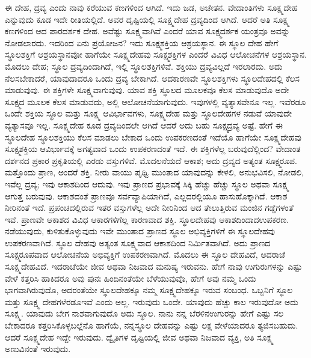 ಈ ದೇಹ, ದ್ರವ್ಯ ಎಂದು ನಾವು ಕರೆಯುವ ಕಣಗಳಿಂದ ಆಗಿದೆ. ಇದು ಜಡ, ಅಚೇತನ. ವೇದಾಂತಿಗಳು ಸೂಕ್ಷ್ಮದೇಹ ಎನ್ನುವುದು ಕೂಡ ಇದೇ ರೀತಿಯಲ್ಲಿದೆ. ಅವರ ದೃಷ್ಟಿಯಲ್ಲಿ ಸೂಕ್ಷ್ಮದೇಹ ದ್ರವ್ಯದಿಂದ ಆಗಿದೆ. ಆದರೆ ಅತಿ ಸೂಕ್ಷ್ಮ ಕಣಗಳಿಂದ ಆದ ಪಾರದರ್ಶಕ ದೇಹ. ಅವೆಷ್ಟು ಸೂಕ್ಷ್ಮವಾಗಿವೆ ಎಂದರೆ ಯಾವ ಸೂಕ್ಷ್ಮದರ್ಶಕ ಯಂತ್ರವೂ ಅವನ್ನು ನೋಡಲಾರದು. ಇದರಿಂದ ಏನು ಪ್ರಯೋಜನ? ಇದು ಸೂಕ್ಷ್ಮಶಕ್ತಿಯ ಆಶ್ರಯಸ್ಥಾನ. ಈ ಸ್ಥೂಲ ದೇಹ ಹೇಗೆ ಸ್ಥೂಲಶಕ್ತಿಗೆ ಆಶ್ರಯಸ್ಥಾನವೋ ಹಾಗೆಯೇ ಸೂಕ್ಷ್ಮದೇಹವು ಸೂಕ್ಷ್ಮಶಕ್ತಿಗಳ ಎಂದರೆ ವಿವಿಧ ಆಲೋಚನೆಗಳ ಆಶ್ರಯಸ್ಥಾನ. ಮೊದಲು ದೇಹ; ಸ್ಥೂಲ ದ್ರವ್ಯದಿಂದಾಗಿದೆ, ಇಲ್ಲಿ ಸ್ಥೂಲಶಕ್ತಿಗಳಿವೆ. ಶಕ್ತಿಯು ದ್ರವ್ಯವಿಲ್ಲದೆ ಇರಲಾರದು. ಅದು ನೆಲಸಬೇಕಾದರೆ, ಯಾವುದಾದರೂ ಒಂದು ದ್ರವ್ಯ ಬೇಕಾಗಿದೆ. ಆದಕಾರಣವೇ ಸ್ಥೂಲಶಕ್ತಿಗಳು ಸ್ಥೂಲದೇಹದಲ್ಲಿ ಕೆಲಸ ಮಾಡುವುವು. ಈ ಶಕ್ತಿಗಳೇ ಸೂಕ್ಷ್ಮವಾಗುವುವು. ಯಾವ ಶಕ್ತಿ ಸ್ಥೂಲದ ಮೂಲಕವೂ ಕೆಲಸ ಮಾಡುವುದೊ ಅದೇ ಸೂಕ್ಷ್ಮದ ಮೂಲಕ ಕೆಲಸ ಮಾಡುವದು, ಅಲ್ಲಿ ಆಲೋಚನೆಯಾಗುವುದು. ಇವುಗಳಲ್ಲಿ ವ್ಯತ್ಯಾಸವೇನೂ ಇಲ್ಲ. ಇವೆರಡೂ ಒಂದೇ ಶಕ್ತಿಯ ಸ್ಥೂಲ ಮತ್ತು ಸೂಕ್ಷ್ಮ ಆವಿರ್ಭಾವಗಳು, ಸೂಕ್ಷ್ಮದೇಹ ಮತ್ತು ಸ್ಥೂಲದೇಹಗಳ ನಡುವೆ ಯಾವುದೇ ವ್ಯತ್ಯಾಸವೂ ಇಲ್ಲ. ಸೂಕ್ಷ್ಮದೇಹ ಕೂಡ ದ್ರವ್ಯದಿಂದಲೇ ಆಗಿದೆ ಆದರೆ ಅದು ಬಹು ಸೂಕ್ಷ್ಮದ್ರವ್ಯ ಅಷ್ಟೆ. ಹೇಗೆ ಈ ಸ್ಥೂಲದೇಹ ಸ್ಥೂಲಶಕ್ತಿಯು ಕೆಲಸ ಮಾಡಲು ಬೇಕಾದ ಒಂದು ಉಪಕರಣದಂತೆ ಇದೆಯೊ ಹಾಗೆಯೇ ಸೂಕ್ಷ್ಮದೇಹವು ಸೂಕ್ಷ್ಮಶಕ್ತಿಯ ಆವಿರ್ಭಾವಕ್ಕೆ ಅಗತ್ಯವಾದ ಒಂದು ಉಪಕರಣದಂತೆ ಇದೆ. ಈ ಶಕ್ತಿಗಳೆಲ್ಲ ಬರುವುದೆಲ್ಲಿಂದ? ವೇದಾಂತ ದರ್ಶನದ ಪ್ರಕಾರ ಪ್ರಕೃತಿಯಲ್ಲಿ ಎರಡು ವಸ್ತುಗಳಿವೆ. ಮೊದಲನೆಯದೆ ಆಕಾಶ; ಅದು ದ್ರವ್ಯದ ಅತ್ಯಂತ ಸೂಕ್ಷ್ಮರೂಪ. ಮತ್ತೊಂದು ಪ್ರಾಣ, ಅಂದರೆ ಶಕ್ತಿ. ನೀರು ವಾಯು ಪೃಥ್ವಿ ಮುಂತಾದ ಯಾವುದನ್ನು ಕೇಳಲಿ, ಅನುಭವಿಸಲಿ, ನೋಡಲಿ, ಇವೆಲ್ಲ ದ್ರವ್ಯ; ಇವು ಆಕಾಶದಿಂದ ಆದುವು. ಇವು ಪ್ರಾಣದ ಪ್ರಭಾವಕ್ಕೆ ಸಿಕ್ಕಿ ಹೆಚ್ಚು ಹೆಚ್ಚು ಸ್ಥೂಲ ಅಥವಾ ಸೂಕ್ಷ್ಮ ಆಗುತ್ತ ಬರುವುವು. ಆಕಾಶದಂತೆ ಪ್ರಾಣವೂ ಸರ್ವವ್ಯಾಪಿಯಾಗಿದೆ, ಎಲ್ಲದರಲ್ಲಿಯೂ ಹಾಸುಹೊಕ್ಕಾಗಿದೆ. ಆಕಾಶ ನೀರಿನಂತೆ ಇದೆ. ಪ್ರಪಂಚದಲ್ಲಿರುವ ಇತರ ವಸ್ತುಗಳೆಲ್ಲ ಅದೇ ನೀರಿನಿಂದ ಆದ ತೇಲುತ್ತಿರುವ ಮಂಜಿನ ಗಡ್ಡೆಗಳಂತೆ ಇವೆ. ಪ್ರಾಣವೇ ಆಕಾಶದ ವಿವಿಧ ಆಕಾರಗಳಿಗೆಲ್ಲ ಕಾರಣವಾದ ಶಕ್ತಿ. ಸ್ಥೂಲದೇಹವು ಆಕಾಶದಿಂದಾದ\break ಉಪಕರಣ. ನಡೆಯುವುದು, ಕುಳಿತುಕೊಳ್ಳುವುದು ಇವೇ ಮುಂತಾದ ಪ್ರಾಣದ ಸ್ಥೂಲ ಅಭಿವ್ಯಕ್ತಿಗಳಿಗೆ ಈ ಸ್ಥೂಲದೇಹವು ಉಪಕರಣವಾಗಿದೆ. ಸ್ಥೂಲ ದೇಹವು ಅತ್ಯಂತ ಸೂಕ್ಷ್ಮವಾದ ಆಕಾಶದಿಂದ ನಿರ್ಮಿತವಾಗಿದೆ. ಅದು ಪ್ರಾಣದ ಸೂಕ್ಷ್ಮರೂಪವಾದ ಆಲೋಚನೆಯ ಅಭಿವ್ಯಕ್ತಿಗೆ ಉಪಕರಣವಾಗಿದೆ. ಮೊದಲು ಈ ಸ್ಥೂಲ ದೇಹವಿದೆ, ಅದರಾಚೆ ಸೂಕ್ಷ್ಮದೇಹವಿದೆ. ಇದರಾಚೆಯೇ ಜೀವ ಅಥವಾ ನಿಜವಾದ ಮನುಷ್ಯ ಇರುವನು. ಹೇಗೆ ನಾವು ಉಗುರುಗಳನ್ನು ಎಷ್ಟು ವೇಳೆ ಕತ್ತರಿಸಿ ಹಾಕಿದರೂ ಅವು ಪುನಃ ಹಿಂದಿನಂತೆಯೇ ಬೆಳೆಯುವುವೊ, ಹೇಗೆ ಅವು ನಮ್ಮ ಒಂದು ಭಾಗವಾಗಿರುವುದೊ, ಅದರಂತೆಯೇ ಸ್ಥೂಲದೇಹಕ್ಕೂ ನಮ್ಮ ಸೂಕ್ಷ್ಮದೇಹಕ್ಕೂ ಇರುವ ಸಂಬಂಧ. ಒಬ್ಬನಿಗೆ ಸ್ಥೂಲ ಮತ್ತು ಸೂಕ್ಷ್ಮ ದೇಹಗಳೆರಡೂ\break ಇವೆ ಎಂದು ಅಲ್ಲ. ಇರುವುದು ಒಂದೇ. ಯಾವುದು ಹೆಚ್ಚು ಕಾಲ ಇರುವುದೋ ಅದು ಸೂಕ್ಷ್ಮ. ಯಾವುದು ಬೇಗ ನಾಶವಾಗುವುದೊ ಅದು ಸ್ಥೂಲ. ನಾನು ನನ್ನ ಬೆರಳಿನ\break ಉಗುರನ್ನು ಹೇಗೆ ಎಷ್ಟು ಸಲ ಬೇಕಾದರೂ ಕತ್ತರಿಸಿಕೊಳ್ಳಬಲ್ಲೆನೊ ಹಾಗೆಯೆ, ನನ್ನ\break ಸ್ಥೂಲ ದೇಹವನ್ನು ಎಷ್ಟು ಲಕ್ಷ ವೇಳೆಯಾದರೂ ತ್ಯಜಿಸಬಹುದು. ಆದರೆ ಸೂಕ್ಷ್ಮದೇಹ ಇದ್ದೇ ಇರುವುದು. ದ್ವೈತಿಗಳ ದೃಷ್ಟಿಯಲ್ಲಿ ಜೀವ ಅಥವಾ ನಿಜವಾದ ವ್ಯಕ್ತಿ, ಅತಿ ಸೂಕ್ಷ್ಮ ಅಣುವಿನಂತೆ ಇರುವುದು.

